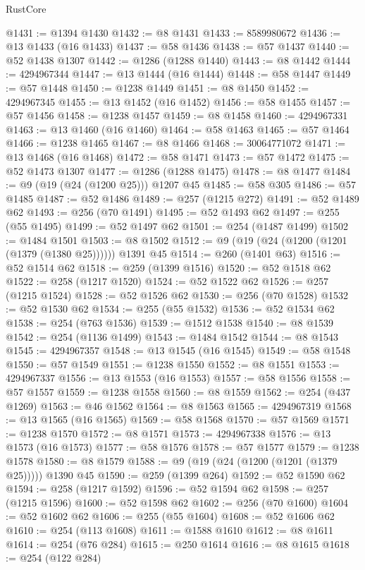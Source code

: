 \begin{lexlean}{RustCore}
\begin{coremodule}
@1431 := @1394 @1430
@1432 := @8 @1431
@1433 := 8589980672
@1436 := @13 @1433 (@16 @1433)
@1437 := @58 @1436
@1438 := @57 @1437
@1440 := @52 @1438 @1307
@1442 := @1286 (@1288 @1440)
@1443 := @8 @1442
@1444 := 4294967344
@1447 := @13 @1444 (@16 @1444)
@1448 := @58 @1447
@1449 := @57 @1448
@1450 := @1238 @1449
@1451 := @8 @1450
@1452 := 4294967345
@1455 := @13 @1452 (@16 @1452)
@1456 := @58 @1455
@1457 := @57 @1456
@1458 := @1238 @1457
@1459 := @8 @1458
@1460 := 4294967331
@1463 := @13 @1460 (@16 @1460)
@1464 := @58 @1463
@1465 := @57 @1464
@1466 := @1238 @1465
@1467 := @8 @1466
@1468 := 30064771072
@1471 := @13 @1468 (@16 @1468)
@1472 := @58 @1471
@1473 := @57 @1472
@1475 := @52 @1473 @1307
@1477 := @1286 (@1288 @1475)
@1478 := @8 @1477
@1484 := @9 (@19 (@24 (@1200 @25))) @1207 @45
@1485 := @58 @305
@1486 := @57 @1485
@1487 := @52 @1486
@1489 := @257 (@1215 @272)
@1491 := @52 @1489 @62
@1493 := @256 (@70 @1491)
@1495 := @52 @1493 @62
@1497 := @255 (@55 @1495)
@1499 := @52 @1497 @62
@1501 := @254 (@1487 @1499)
@1502 := @1484 @1501
@1503 := @8 @1502
@1512 := @9 (@19 (@24 (@1200 (@1201 (@1379 (@1380 @25)))))) @1391 @45
@1514 := @260 (@1401 @63)
@1516 := @52 @1514 @62
@1518 := @259 (@1399 @1516)
@1520 := @52 @1518 @62
@1522 := @258 (@1217 @1520)
@1524 := @52 @1522 @62
@1526 := @257 (@1215 @1524)
@1528 := @52 @1526 @62
@1530 := @256 (@70 @1528)
@1532 := @52 @1530 @62
@1534 := @255 (@55 @1532)
@1536 := @52 @1534 @62
@1538 := @254 (@763 @1536)
@1539 := @1512 @1538
@1540 := @8 @1539
@1542 := @254 (@1136 @1499)
@1543 := @1484 @1542
@1544 := @8 @1543
@1545 := 4294967357
@1548 := @13 @1545 (@16 @1545)
@1549 := @58 @1548
@1550 := @57 @1549
@1551 := @1238 @1550
@1552 := @8 @1551
@1553 := 4294967337
@1556 := @13 @1553 (@16 @1553)
@1557 := @58 @1556
@1558 := @57 @1557
@1559 := @1238 @1558
@1560 := @8 @1559
@1562 := @254 (@437 @1269)
@1563 := @46 @1562
@1564 := @8 @1563
@1565 := 4294967319
@1568 := @13 @1565 (@16 @1565)
@1569 := @58 @1568
@1570 := @57 @1569
@1571 := @1238 @1570
@1572 := @8 @1571
@1573 := 4294967338
@1576 := @13 @1573 (@16 @1573)
@1577 := @58 @1576
@1578 := @57 @1577
@1579 := @1238 @1578
@1580 := @8 @1579
@1588 := @9 (@19 (@24 (@1200 (@1201 (@1379 @25))))) @1390 @45
@1590 := @259 (@1399 @264)
@1592 := @52 @1590 @62
@1594 := @258 (@1217 @1592)
@1596 := @52 @1594 @62
@1598 := @257 (@1215 @1596)
@1600 := @52 @1598 @62
@1602 := @256 (@70 @1600)
@1604 := @52 @1602 @62
@1606 := @255 (@55 @1604)
@1608 := @52 @1606 @62
@1610 := @254 (@113 @1608)
@1611 := @1588 @1610
@1612 := @8 @1611
@1614 := @254 (@76 @284)
@1615 := @250 @1614
@1616 := @8 @1615
@1618 := @254 (@122 @284)

\end{coremodule}
\end{lexlean}
